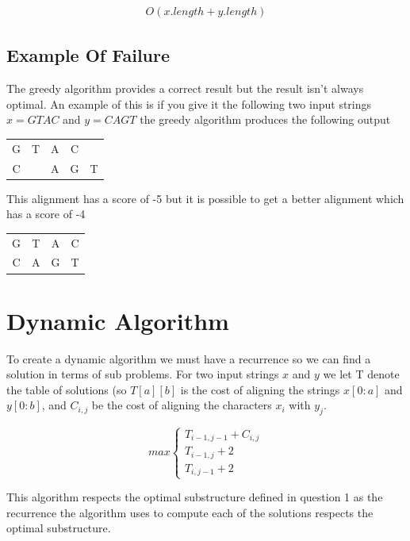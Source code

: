 \documentclass{article}
\begin{document}
				\begin{align}
					O(x.length + y.length)
				\end{align}
	
			
			\subsection{Example Of Failure}
				The greedy algorithm provides a correct result but the result isn't always optimal. An example of this is if you give it the following two input strings $x = GTAC$ and $y = CAGT$ the greedy algorithm produces the following output
		
				\begin{center}
					\begin{tabular}{ c c c c c }
						G & T & A & C & \\
						C &  & A & G & T
					\end{tabular}
				\end{center}						
  				
  				This alignment has a score of -5 but it is possible to get a better alignment which has a score of -4
  				
  				\begin{center}
					\begin{tabular}{ c c c c }
						G & T & A & C \\
						C & A & G & T
					\end{tabular}
				\end{center}				
			
			\break			
			
			\section{Dynamic Algorithm}
			
				To create a dynamic algorithm we must have a recurrence so we can find a solution in terms of sub problems. For two input strings $x$ and $y$ we let T denote the table of solutions (so $T[a][b]$ is the cost of aligning the strings $x[0:a]$ and $y[0:b]$, and $C_{i,j}$ be the cost of aligning the characters $x_i$ with $y_j$.
				
				\[max
					\begin{cases}
						T_{i-1, j-1} + C_{i,j}\\
						T_{i-1,j} + 2\\
						T_{i, j-1} + 2
					\end{cases}
				\]
				
				This algorithm respects the optimal substructure defined in question 1 as the recurrence the algorithm uses to compute each of the solutions respects the optimal substructure.
					
\end{document}
